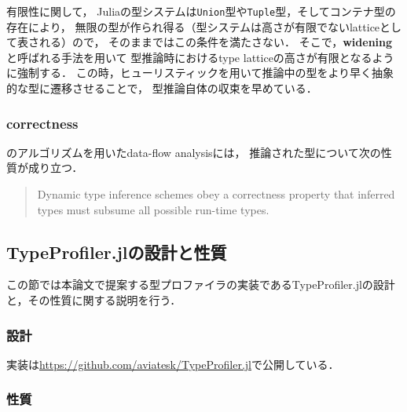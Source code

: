 有限性に関して，
Juliaの型システムは\verb|Union|型や\verb|Tuple|型，そしてコンテナ型の存在により，
無限の型が作られ得る（型システムは高さが有限でないlatticeとして表される）ので，
そのままではこの条件を満たさない．
そこで，\textbf{widening}と呼ばれる手法を用いて
型推論時におけるtype latticeの高さが有限となるように強制する．
この時，ヒューリスティックを用いて推論中の型をより早く抽象的な型に遷移させることで，
型推論自体の収束を早めている．

\subsubsection{correctness} \label{subsubsection:inference-correctness}

\cite{graph-free-data-flow-analysis}のアルゴリズムを用いたdata-flow analysisには，
推論された型について次の性質が成り立つ\cite{jeff-master}．

\begin{quote}
  Dynamic type inference schemes obey a correctness property that inferred types
  must subsume all possible run-time types.
\end{quote}


\subsection{TypeProfiler.jlの設計と性質}

この節では本論文で提案する型プロファイラの実装であるTypeProfiler.jlの設計と，その性質に関する説明を行う．

\subsubsection{設計}



実装は\url{https://github.com/aviatesk/TypeProfiler.jl}で公開している．

\subsubsection{性質}




